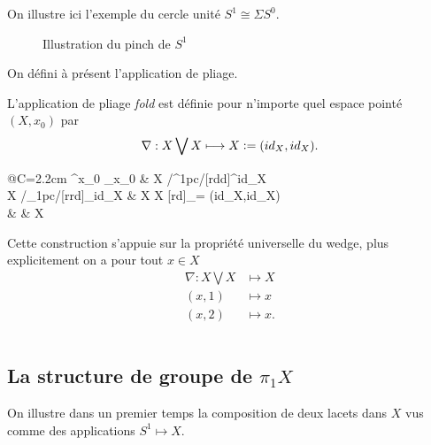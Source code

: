 \documentclass[main.tex]{subfiles}
\begin{document}
	\begin{example}
		On illustre ici l'exemple du cercle unité $S^{1} \cong \Sigma S^{0}$.	
		\begin{figure}[h]
			\centering
			\def\svgwidth{0.8\textwidth}
			
			\caption{Illustration du pinch de $S^{1}$}
		\end{figure}
	\end{example}
	On défini à présent l'application de pliage.
	\begin{definition}[Fold]
		L'application de pliage \emph{fold} est définie pour n'importe quel espace pointé $(X,x_{0})$ par \[
			\nabla : X \bigvee X \longmapsto X \vcentcolon= (id_X,id_X)
		.\]
		\begin{minipage}{0.7\textwidth}
			\xymatrix@R=2.2cm@C=2.2cm{
				\star \ar[r]^{x_{0}}      \ar[d]_{x_{0}}         & X \ar[d] \ar@/^1pc/[rdd]^{id_X}   \\
				X \ar[r] \ar@/_1pc/[rrd]_{id_X} & X \bigvee X \ar@{-->}[rd]_{\nabla = (id_X,id_X)}             \\
								&                                   & X 
							}
		\end{minipage}
		\hfill
		\begin{minipage}{0.5\textwidth}
			Cette construction s'appuie sur la propriété universelle du wedge, plus explicitement on a pour tout $x \in X$
			\begin{align*}
				\nabla : X \bigvee X &\longmapsto X \\
				(x,1) &\longmapsto x \\
				(x,2) &\longmapsto x
			.\end{align*}
		\end{minipage}
		\[
	\]
	\end{definition}
	\subsection{La structure de groupe de $\pi_{1} X$} 
	On illustre dans un premier temps la composition de deux lacets dans $X$ vus comme des applications $S^{1} \longmapsto X$.
\end{document}
